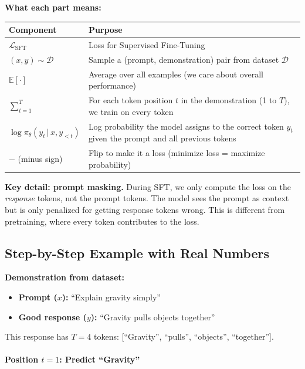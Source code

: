 \begin{chapterenv}
\begin{infobox}
\textbf{What each part means:}

\begin{center}
\begin{tabular}{p{}p{}}
\toprule
\textbf{Component} & \textbf{Purpose} \\
\midrule
$\mathcal{L}_{\text{SFT}}$ & Loss for Supervised Fine-Tuning \\
$(x, y) \sim \mathcal{D}$ & Sample a (prompt, demonstration) pair from dataset $\mathcal{D}$ \\
$\mathbb{E}[\cdot]$ & Average over all examples (we care about overall performance) \\
$\sum_{t=1}^T$ & For each token position $t$ in the demonstration (1 to $T$), we train on every token \\
$\log \pi_\theta(y_t \,|\, x, y_{<t})$ & Log probability the model assigns to the correct token $y_t$ given the prompt and all previous tokens \\
$-$ (minus sign) & Flip to make it a loss (minimize loss = maximize probability) \\
\bottomrule
\end{tabular}
\end{center}

\textbf{Key detail: prompt masking.} During SFT, we only compute the loss on the \textit{response} tokens, not the prompt tokens. The model sees the prompt as context but is only penalized for getting response tokens wrong. This is different from pretraining, where every token contributes to the loss.
\end{infobox}

\subsection{Step-by-Step Example with Real Numbers}

\textbf{Demonstration from dataset:}
\begin{itemize}[nosep]
    \item \textbf{Prompt ($x$):} ``Explain gravity simply''
    \item \textbf{Good response ($y$):} ``Gravity pulls objects together''
\end{itemize}

This response has $T = 4$ tokens: [``Gravity'', ``pulls'', ``objects'', ``together''].

\paragraph{Position $t=1$: Predict ``Gravity''}


\end{chapterenv}
